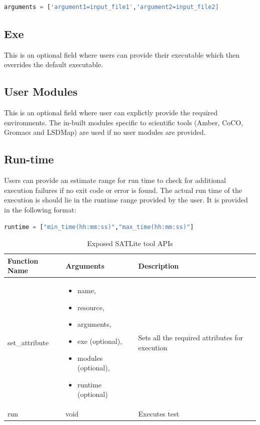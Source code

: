\documentclass[10pt]{ruthesis}
\begin{document}
\begin{lstlisting}[language=Python,linewidth=13cm]
 arguments = ['argument1=input_file1','argument2=input_file2]
\end{lstlisting}

\subsection{Exe}
This is an optional field where users can provide their executable which then overrides the default executable.

\subsection{User Modules}
This is an optional field where user can explictly provide the required environments. The in-built modules specific to scientific tools (Amber, CoCO, Gromacs and LSDMap) are used if no user modules are provided.

\subsection{Run-time}
Users can provide an estimate range for run time to check for additional execution failures if no exit code or error is found. The actual run time of the execution is should lie in the runtime range provided by the user. It is provided in the following format:

\begin{lstlisting}[language=Python,linewidth=12cm]
 runtime = ["min_time(hh:mm:ss)","max_time(hh:mm:ss)"]
\end{lstlisting}

\begin{table}
\begin{center}
\def\arraystretch{1.5}
\begin{tabular}{|p{4cm}|p{5cm}|p{6cm}|}
\hline
\rule{0pt}{15pt} \textbf{Function Name} & \textbf{Arguments} & \textbf{Description} \\[2ex]
\hline
set\_attribute &
	\begin{itemize}
	\item name,
	\item resource,
	\item arguments,
	\item exe (optional),
	\item modules (optional),
	\item runtime (optional)
	\end{itemize} &
Sets all the required attributes for execution
\\
\hline
run &
void &
Executes test
\\
\hline
\end{tabular}
\end{center}
\caption{Exposed SATLite tool APIs}
\label{satapi}
\end{table}
\end{document}

